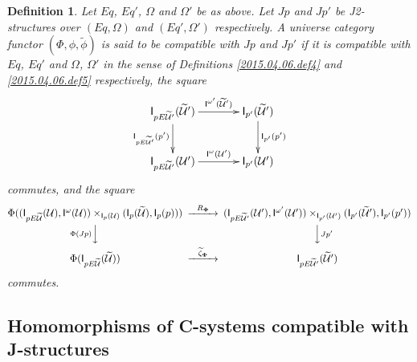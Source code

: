 \documentclass[12pt]{article}
\numberwithin{equation}{section}
\newtheorem{definition}[proposition]{Definition}
\newcommand{\wt}{\widetilde}
\newcommand{\U}{\mathcal{U}}
\newcommand{\I}{\mathsf{I}}
\begin{document}
\begin{definition}
\label{2015.04.06.def6} Let $Eq$, $Eq'$, $\Omega$ and $\Omega'$ be as
above. Let $Jp$ and $Jp'$ be J2-structures over $(Eq,\Omega)$ and
$(Eq',\Omega')$ respectively.  A universe category functor
$(\Phi,\phi,\wt{\phi})$ is said to be compatible with $Jp$ and $Jp'$ if it is
compatible with $Eq$, $Eq'$ and $\Omega$, $\Omega'$ in the sense of Definitions
\ref{2015.04.06.def4} and \ref{2015.04.06.def5} respectively, the square
%
$$
\begin{xy}
          \xymatrix@C=3pc{ \I_{pE\wt{\U}'}(\wt{\U}')
            \ar[r]^-{\I^{\omega'}(\wt{\U}')} \ar[d]_-{\I_{pE\wt{\U}'}(p')} &
            \I_{p'}(\wt{\U}')\ar[d]^-{\I_{p'}(p')}\\ \I_{pE\wt{\U}'}(\U')
            \ar[r]^-{\I^{\omega}(\U')} & \I_{p'}(\U') }
\end{xy}
$$
commutes, and the square
$$
\begin{CD}
\Phi((\I_{pE\wt{\U}}(\U), \I^{\omega}(\U))\times_{\I_p(\U)} (\I_p(\wt{\U}), \I_p(p)))
@>R_{\bf\Phi}>>
(\I_{pE\wt{\U}'}(\U'),\I^{\omega'}(\U'))\times_{\I_{p'}(\U')}(\I_{p'}(\wt{\U}'),\I_{p'}(p'))\\ @V\Phi(Jp)
VV @VVJp' V\\ \Phi(\I_{pE\wt{\U}}(\wt{\U})) @>\wt{\zeta}_{\bf\Phi}>>
\I_{pE\wt{\U}'}(\wt{\U}')
\end{CD}
$$
%
commutes.
\end{definition}




\subsection{Homomorphisms of C-systems compatible with J-structures}
%
\end{document}
